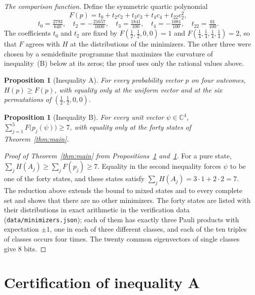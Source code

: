 \documentclass[11pt,a4paper]{article}
\newtheorem{proposition}[theorem]{Proposition}
\theoremstyle{plain}
\newcommand{\C}{\mathbb C}
\begin{document}
\emph{The comparison function.} Define the symmetric quartic polynomial
\begin{equation}\label{eq:F}
  F(p)=t_0+t_2c_2+t_3c_3+t_4c_4+t_{22}c_2^2,
\end{equation}
\begin{equation*}
  t_0=\tfrac{2793}{640},\quad t_2=-\tfrac{21657}{1600},\quad
  t_3=\tfrac{1841}{100},\quad t_4=-\tfrac{1081}{100},\quad t_{22}=\tfrac{61}{100}.
\end{equation*}
The coefficients $t_0$ and $t_2$ are fixed by $F(\tfrac12,\tfrac12,0,0)=1$ and
$F(\tfrac14,\tfrac14,\tfrac14,\tfrac14)=2$, so that $F$ agrees with $H$ at the
distributions of the minimizers. The other three were chosen by a semidefinite
programme that maximizes the curvature of inequality~(B) below at its zeros;
the proof uses only the rational values above.

\begin{proposition}[Inequality A]\label{prop:A}
For every probability vector $p$ on four outcomes, $H(p)\ge F(p)$, with
equality only at the uniform vector and at the six permutations of
$(\tfrac12,\tfrac12,0,0)$.
\end{proposition}

\begin{proposition}[Inequality B]\label{prop:B}
For every unit vector $\psi\in\C^4$,
$\sum_{j=1}^5F\bigl(p_j(\psi)\bigr)\ge7$, with equality only at the forty
states of Theorem~\ref{thm:main}.
\end{proposition}

\begin{proof}[Proof of Theorem~\ref{thm:main} from Propositions~\ref{prop:A} and~\ref{prop:B}]
For a pure state, $\sum_jH(A_j)\ge\sum_jF(p_j)\ge7$. Equality in the second
inequality forces $\psi$ to be one of the forty states, and these states
satisfy $\sum_jH(A_j)=3\cdot1+2\cdot2=7$. The reduction above extends the
bound to mixed states and to every complete set and shows that there are no
other minimizers. The forty states are listed with their distributions in
exact arithmetic in the verification data (\texttt{data/minimizers.json});
each of them has exactly three Pauli products with expectation $\pm1$, one in
each of three different classes, and each of the ten triples of classes occurs
four times. The twenty common eigenvectors of single classes give $8$ bits.
\end{proof}

\section{Certification of inequality A}\label{sec:A}
\end{document}

